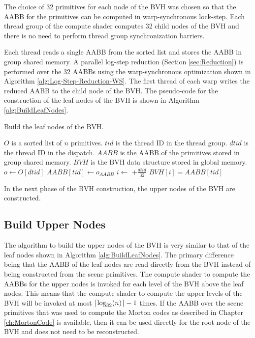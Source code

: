 The choice of 32 primitives for each node of the BVH was chosen so that the AABB for the primitives can be computed in warp-synchronous lock-step. Each thread group of the compute shader computes 32 child nodes of the BVH and there is no need to perform thread group synchronization barriers.

Each thread reads a single AABB from the sorted list and stores the AABB in group shared memory. A parallel log-step reduction (Section \ref{sec:Reduction}) is performed over the 32 AABBs using the warp-synchronous optimization shown in Algorithm \ref{alg:Log-Step-Reduction-WS}. The first thread of each warp writes the reduced AABB to the child node of the BVH. The pseudo-code for the construction of the leaf nodes of the BVH is shown in Algorithm \ref{alg:BuildLeafNodes}.

\begin{algorithm}[H]
\caption{Build the leaf nodes of the BVH.}
\label{alg:BuildLeafNodes}
\begin{algorithmic}[1]
\Require $O$ is a sorted list of $n$ primitives.
\Require $tid$ is the thread ID in the thread group.
\Require $dtid$ is the thread ID in the dispatch.
\Require $AABB$ is the AABB of the primitives stored in group shared memory.
\Ensure $BVH$ is the BVH data structure stored in global memory.
\State $o \gets O[dtid]$
\State $AABB[tid] \gets o_{AABB}$
\State {}
\State $i \gets$  $+\frac{dtid}{32}$
\State $BVH[i] = AABB[tid]$
\EndIf
\EndFunction
\end{algorithmic}
\end{algorithm}

In the next phase of the BVH construction, the upper nodes of the BVH are constructed.

\subsection{Build Upper Nodes}

The algorithm to build the upper nodes of the BVH is very similar to that of the leaf nodes shown in Algorithm \ref{alg:BuildLeafNodes}. The primary difference being that the AABB of the leaf nodes are read directly from the BVH instead of being constructed from the scene primitives. The compute shader to compute the AABBs for the upper nodes is invoked for each level of the BVH above the leaf nodes. This means that the compute shader to compute the upper levels of the BVH will be invoked at most $\lceil\log_{32}(n)\rceil-1$ times. If the AABB over the scene primitives that was used to compute the Morton codes as described in Chapter \ref{ch:MortonCode} is available, then it can be used directly for the root node of the BVH and does not need to be reconstructed.

